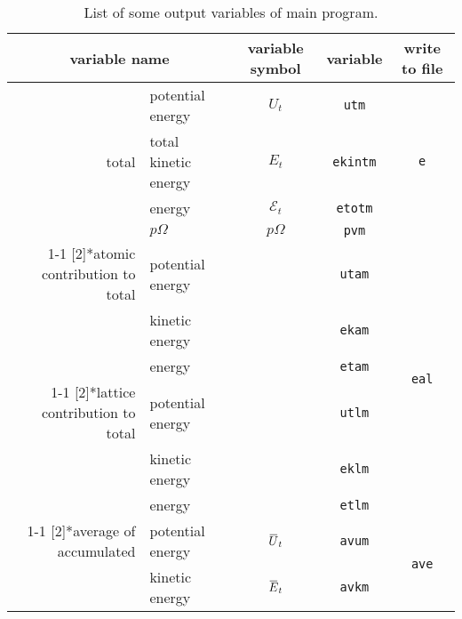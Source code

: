 \begin{table}[h]
	\centering
	\caption{List of some output variables of main program.}
	\begin{tabular}{@{}rlccc@{}}
		\toprule
		\multicolumn{2}{c}{variable name} & variable symbol & variable & write to file \\
		\midrule
		\multirow{4}[2]{*}{total}                                                         & potential energy     & $U_t$           & \texttt{utm}    & \multirow{4}[2]{*}{\texttt{e}}   \\
		                                                                                  & total kinetic energy & $E_t$           & \texttt{ekintm} &                                  \\
		                                                                                  & energy               & $\mathscr{E}_t$ & \texttt{etotm}  &                                  \\
		                                                                                  & $p \Omega$           & $p \Omega$      & \texttt{pvm}    &                                  \\
		\cmidrule{1-1}\cmidrule{4-5}    \multirow{3}[2]{*}{atomic contribution to total}  & potential energy     &                 & \texttt{utam}   & \multirow{6}[4]{*}{\texttt{eal}} \\
		                                                                                  & kinetic energy       &                 & \texttt{ekam}   &                                  \\
		                                                                                  & energy               &                 & \texttt{etam}   &                                  \\
		\cmidrule{1-1}\cmidrule{4-4}    \multirow{3}[2]{*}{lattice contribution to total} & potential energy     &                 & \texttt{utlm}   &                                  \\
		                                                                                  & kinetic energy       &                 & \texttt{eklm}   &                                  \\
		                                                                                  & energy               &                 & \texttt{etlm}   &                                  \\
		\cmidrule{1-1}\cmidrule{4-5}    \multirow{2}[2]{*}{average of accumulated}        & potential energy     & $\mean{U}_t$    & \texttt{avum}   & \multirow{2}[2]{*}{\texttt{ave}} \\
		                                                                                  & kinetic energy       & $\mean{E}_t$    & \texttt{avkm}   &                                  \\
		\bottomrule
	\end{tabular}
	\label{tab:lstvar}%
\end{table}%

